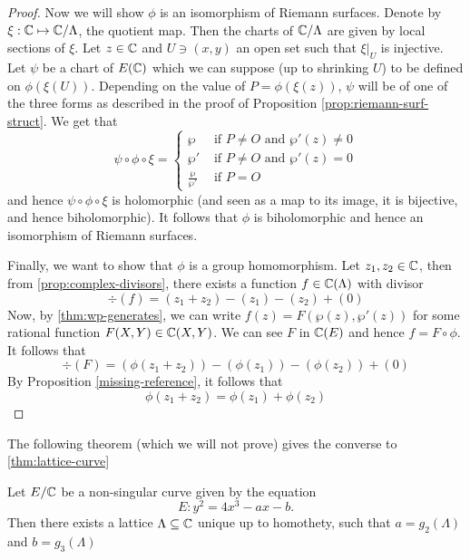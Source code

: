 \begin{proof}
	Now we will show $\phi$ is an isomorphism of Riemann surfaces.
	Denote by $\xi: \mathbb{C} \mapsto \mathbb{C}/\Lambda$, the quotient map.
	Then the charts of $\mathbb{C}/\Lambda$ are given by local sections of $\xi$.
	Let $z \in \mathbb{C}$ and $U \ni (x, y)$ an open set such that 
	$\xi\vert_U$ is injective. Let $\psi$ be a chart of $E(\mathbb{C})$
	which we can suppose (up to shrinking $U$) to be defined on
	$\phi(\xi(U))$.
	Depending on the value of $P = \phi(\xi(z))$, $\psi$ will be of one of the
	three forms as described in the proof of 
	Proposition \ref{prop:riemann-surf-struct}.
	We get that
	\begin{equation*}
		\psi\circ\phi\circ\xi = 
		\begin{cases}
			\wp &\textrm{ if } P \neq O\textrm{ and }\wp'(z) \neq 0\\
			\wp' &\textrm{ if } P \neq O\textrm{ and }\wp'(z) = 0\\
			\frac{\wp}{\wp'} &\textrm{ if }P = O
		\end{cases}
	\end{equation*}
	and hence $\psi\circ\phi\circ\xi$ is holomorphic (and seen as a map to its
	image, it is bijective, and hence biholomorphic). It follows that
	$\phi$ is biholomorphic and hence an isomorphism of Riemann surfaces.
	
	Finally, we want to show that $\phi$ is a group homomorphism.
	Let $z_1, z_2 \in \mathbb{C}$, then from \ref{prop:complex-divisors}, there exists
	a function $f \in \mathbb{C}(\Lambda)$ with divisor
	\begin{equation*}
		\div(f) = (z_1 + z_2) - (z_1) - (z_2) + (0)
	\end{equation*}
	Now, by \ref{thm:wp-generates}, we can write $f(z) = F(\wp(z), \wp'(z))$ for
	some rational function $F(X, Y) \in \mathbb{C}(X, Y)$. We can see $F$ in
	$\mathbb{C}(E)$ and hence $f = F \circ \phi$. It follows that
	\begin{equation*}
		\div (F) = (\phi(z_1 + z_2)) - (\phi(z_1)) - (\phi(z_2)) + (0)
	\end{equation*}
	By Proposition \ref{missing-reference}, it follows that
	\begin{equation*}
		\phi(z_1 + z_2) = \phi(z_1) + \phi(z_2)
	\end{equation*}
\end{proof}

The following theorem (which we will not prove) gives the converse to \ref{thm:lattice-curve}

\begin{theorem}
	\label{thm:curve-lattice}
	Let $E/\mathbb{C}$ be a non-singular curve given by the equation
	\begin{equation*}
		E: y^2 = 4x^3 - ax - b.
	\end{equation*} 
	Then there exists a lattice
	$\Lambda \subseteq \mathbb{C}$ unique up to homothety, such that
	$a = g_2(\Lambda)$ and $b = g_3(\Lambda)$
\end{theorem}

